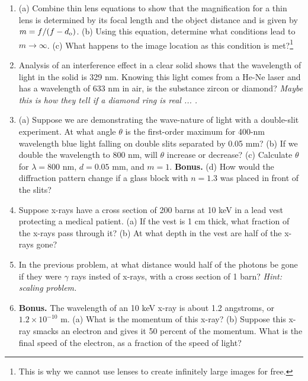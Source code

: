 \documentclass[12pt,twocolumn]{article}
\begin{document}
\begin{enumerate}
\item (a) Combine thin lens equations to show that the magnification for a thin lens is determined by its focal length and the object distance and is given by $m=f/(f - d_{\rm o})$. (b) Using this equation, determine what conditions lead to $m \to \infty$. (c) What happens to the image location as this condition is met?\footnote{This is why we cannot use lenses to create infinitely large images for free.} \\ \vspace{3cm}
\item Analysis of an interference effect in a clear solid shows that the wavelength of light in the solid is 329 nm. Knowing this light comes from a He-Ne laser and has a wavelength of 633 nm in air, is the substance zircon or diamond? \textit{Maybe this is how they tell if a diamond ring is real ... .}\\ \vspace{1cm}
\item (a) Suppose we are demonstrating the wave-nature of light with a double-slit experiment.  At what angle $\theta$ is the first-order maximum for 400-nm wavelength blue light falling on double slits separated by 0.05 mm? (b) If we double the wavelength to 800 nm, will $\theta$ increase or decrease? (c) Calculate $\theta$ for $\lambda = 800$ nm, $d = 0.05$ mm, and $m = 1$.  \textbf{Bonus.} (d) How would the diffraction pattern change if a glass block with $n = 1.3$ was placed in front of the slits? \\ \vspace{2.5cm}
\item Suppose x-rays have a cross section of 200 barns at 10 keV in a lead vest protecting a medical patient. (a) If the vest is 1 cm thick, what fraction of the x-rays pass through it? (b) At what depth in the vest are half of the x-rays gone? \\ \vspace{2cm}
\item In the previous problem, at what distance would half of the photons be gone if they were $\gamma$ rays insted of x-rays, with a cross section of 1 barn?  \textit{Hint: scaling problem.} \\ \vspace{2cm}
\item \textbf{Bonus.}  The wavelength of an 10 keV x-ray is about 1.2 angstroms, or $1.2 \times 10^{-10}$ m.  (a) What is the momentum of this x-ray? (b) Suppose this x-ray smacks an electron and gives it 50 percent of the momentum.  What is the final speed of the electron, as a fraction of the speed of light? \\ \vspace{2cm}

\end{enumerate}
\end{document}
